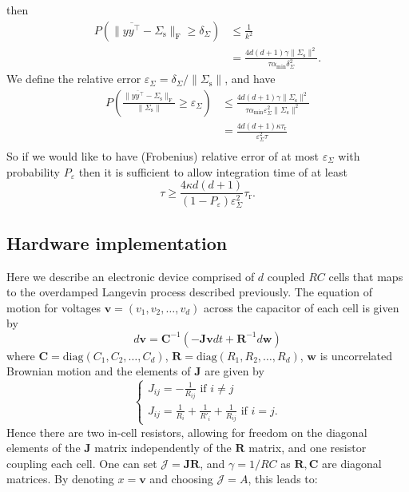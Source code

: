 \documentclass[prx,onecolumn,floatfix,longbibliography,notitlepage, nofootinbib,12pt]{revtex4-2}
\renewcommand{\geq}{\geqslant}
\renewcommand{\leq}{\leqslant}
\begin{document}
\begin{appendix}
then
\begin{align}
    P\left( \|\overline{y y^\intercal} - \Sigma_\text{s}\|_\text{F} \geq \delta_\Sigma \right)
    &\leq \frac{1}{k^2}\\
    & = \frac{4 d (d+1) \gamma \|\Sigma_\text{s}\|^2}{\tau \alpha_\text{min} \delta_\Sigma^2}.
\end{align}
We define the relative error $\varepsilon_\Sigma = \delta_\Sigma/\|\Sigma_\text{s}\|$, and have 
\begin{align}
    P\left( \frac{\|\overline{y y^\intercal} - \Sigma_\text{s}\|_\text{F}}{\|\Sigma_\text{s}\|} \geq \varepsilon_\Sigma \right)
    & \leq \frac{4 d (d+1) \gamma \|\Sigma_\text{s}\|^2}{\tau \alpha_\text{min} \varepsilon_\Sigma^2 \|\Sigma_\text{s}\|^2}\\
    & =  \frac{4 d (d+1) \kappa \tau_\text{r}}{  \varepsilon_\Sigma^2 \tau }\\
\end{align}
So if we would like to have  (Frobenius) relative error of at most $\varepsilon_\Sigma$ with probability $P_\varepsilon$ then it is sufficient to allow integration time of at least
\begin{equation}
    \tau \geq \frac{4 \kappa d(d+1)}{(1-P_\varepsilon)\varepsilon_\Sigma^2}\tau_\text{r}.
\end{equation}


\subsection{Hardware implementation}\label{app:hw}
Here we describe an electronic device comprised of $d$ coupled $RC$ cells that maps to the overdamped Langevin process described previously. The equation of motion for voltages $\mathbf{v} = (v_1, v_2, \ldots, v_d)$ across the capacitor of each cell is given by
\begin{equation}d\mathbf{v} = \mathbf{C}^{-1}(-\mathbf{J}\mathbf{v}dt+\mathbf{R}^{-1}d\mathbf{w})\end{equation}
where $\mathbf{C} = \mathrm{diag}(C_1, C_2, \ldots, C_d)$, $\mathbf{R} = \mathrm{diag}(R_1, R_2, \ldots, R_d)$, $\mathbf{w}$ is uncorrelated Brownian motion and the elements of $\mathbf{J}$ are given by
\begin{equation}
    \begin{cases}
    J_{ij} = -\frac{1}{R_{ij}} \text{ if } i\neq j \\
    J_{ij} = \frac{1}{R_{i}} + \frac{1}{R'_{i}} + \frac{1}{R_{ij}} \text{ if } i= j.
\end{cases}
\end{equation}
Hence there are two in-cell resistors, allowing for freedom on the diagonal elements of the $\mathbf{J}$ matrix independently of the $\mathbf{R}$ matrix, and one resistor coupling each cell. One can set $\mathcal{J} = \mathbf{J} \mathbf{R}$, and $\gamma = 1/RC$ as $\mathbf{R},\mathbf{C}$ are diagonal matrices. By denoting $x = \mathbf{v}$ and choosing $\mathcal{J} = A$, this leads to:


\end{appendix}
\end{document}

